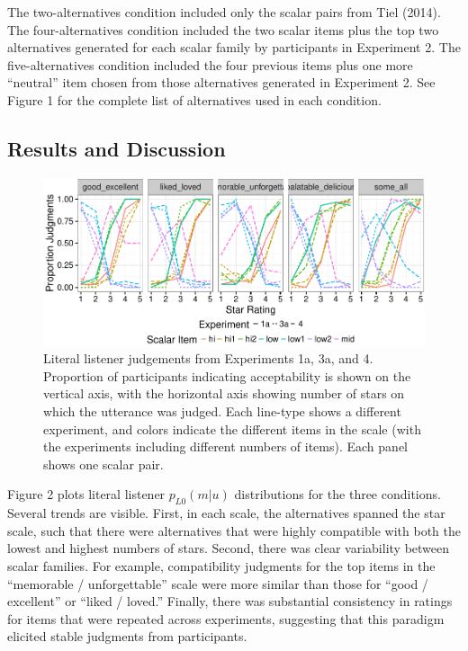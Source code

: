 \documentclass[10pt, letterpaper]{article}
\newenvironment{CodeChunk}{}{}
\begin{document}
The two-alternatives condition included only the scalar pairs from Tiel
(2014). The four-alternatives condition included the two scalar items
plus the top two alternatives generated for each scalar family by
participants in Experiment 2. The five-alternatives condition included
the four previous items plus one more ``neutral'' item chosen from those
alternatives generated in Experiment 2. See Figure 1 for the complete
list of alternatives used in each condition.

\subsection{Results and Discussion}\label{results-and-discussion}

\begin{CodeChunk}
\begin{figure}[t]

{\centering \includegraphics{figs/exp1Plots-1} 

}

\caption[Literal listener judgements from Experiments 1a, 3a, and 4]{Literal listener judgements from Experiments 1a, 3a, and 4. Proportion of participants indicating acceptability is shown on the vertical axis, with the horizontal axis showing number of stars on which the utterance was judged. Each line-type shows a different experiment, and colors indicate the different items in the scale (with the experiments including different numbers of items).  Each panel shows one scalar pair.}\label{fig:exp1Plots}
\end{figure}
\end{CodeChunk}

Figure 2 plots literal listener \(p_{L0}(m|u)\) distributions for the
three conditions. Several trends are visible. First, in each scale, the
alternatives spanned the star scale, such that there were alternatives
that were highly compatible with both the lowest and highest numbers of
stars. Second, there was clear variability between scalar families. For
example, compatibility judgments for the top items in the ``memorable /
unforgettable'' scale were more similar than those for ``good /
excellent'' or ``liked / loved.'' Finally, there was substantial
consistency in ratings for items that were repeated across experiments,
suggesting that this paradigm elicited stable judgments from
participants.
\end{document}
